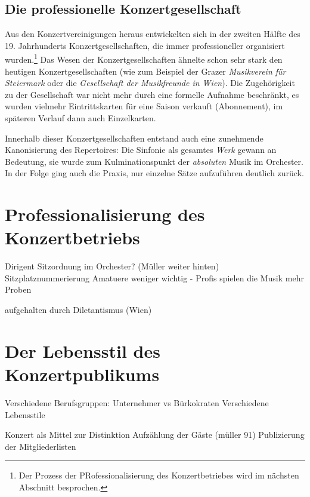 \documentclass[a4paper, german, oneside]{scrbook}
\begin{document}
\subsection{Die professionelle Konzertgesellschaft}
\label{konzertgesellschaft}
Aus den Konzertvereinigungen heraus entwickelten sich in der zweiten Hälfte des 19. Jahrhunderts Konzertgesellschaften, die immer professioneller organisiert wurden.\footnote{Der Prozess der PRofessionalisierung des Konzertbetriebes wird im nächsten Abschnitt besprochen.} Das Wesen der Konzertgesellschaften ähnelte schon sehr stark den heutigen Konzertgesellschaften (wie zum Beispiel der Grazer \emph{Musikverein für Steiermark} oder die \emph{Gesellschaft der Musikfreunde in Wien}). Die Zugehörigkeit zu der Gesellschaft war nicht mehr durch eine formelle Aufnahme beschränkt, es wurden vielmehr Eintrittskarten für eine Saison verkauft (Abonnement), im späteren Verlauf dann auch Einzelkarten. \parencite[106]{heister_konzert:_1983}

Innerhalb dieser Konzertgesellschaften entstand auch eine zunehmende Kanonisierung des Repertoires: Die Sinfonie als gesamtes \emph{Werk} gewann an Bedeutung, sie wurde zum Kulminationspunkt der \emph{absoluten} Musik im Orchester. In der Folge ging auch die Praxis, nur einzelne Sätze aufzuführen deutlich zurück. \parencite[231ff.]{muller_publikum_2014}


\section{Professionalisierung des Konzertbetriebs}
\label{professionalisierung}

Dirigent
Sitzordnung im Orchester? (Müller weiter hinten)
Sitzplatznummerierung
Amatuere weniger wichtig - Profis spielen die Musik
mehr Proben

aufgehalten durch Diletantismus (Wien)
\section{Der Lebensstil des Konzertpublikums} %
\label{lebensstil}

Verschiedene Berufsgruppen: Unternehmer vs Bürkokraten
Verschiedene Lebensstile

Konzert als Mittel zur Distinktion
Aufzählung der Gäste (müller 91)
Publizierung der Mitgliederlisten


\end{document}
